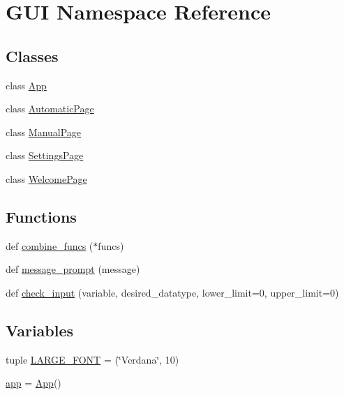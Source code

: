 \hypertarget{namespace_g_u_i}{}\section{G\+UI Namespace Reference}
\label{namespace_g_u_i}
\subsection*{Classes}
\begin{DoxyCompactItemize}
\item 
class \mbox{\hyperlink{class_g_u_i_1_1_app}{App}}
\item 
class \mbox{\hyperlink{class_g_u_i_1_1_automatic_page}{Automatic\+Page}}
\item 
class \mbox{\hyperlink{class_g_u_i_1_1_manual_page}{Manual\+Page}}
\item 
class \mbox{\hyperlink{class_g_u_i_1_1_settings_page}{Settings\+Page}}
\item 
class \mbox{\hyperlink{class_g_u_i_1_1_welcome_page}{Welcome\+Page}}
\end{DoxyCompactItemize}
\subsection*{Functions}
\begin{DoxyCompactItemize}
\item 
def \mbox{\hyperlink{namespace_g_u_i_a4906784b90d5a5544ca9023bee63983e}{combine\+\_\+funcs}} ($\ast$funcs)
\item 
def \mbox{\hyperlink{namespace_g_u_i_aae078fdef2bd79cc7c7c1f2a917c18b1}{message\+\_\+prompt}} (message)
\item 
def \mbox{\hyperlink{namespace_g_u_i_ab5eebe1279ba51c95948fa550f2bc96c}{check\+\_\+input}} (variable, desired\+\_\+datatype, lower\+\_\+limit=0, upper\+\_\+limit=0)
\end{DoxyCompactItemize}
\subsection*{Variables}
\begin{DoxyCompactItemize}
\item 
tuple \mbox{\hyperlink{namespace_g_u_i_a0a43ec6a3ff3feb9855ba08afbe1cff4}{L\+A\+R\+G\+E\+\_\+\+F\+O\+NT}} = (\char`\"{}Verdana\char`\"{}, 10)
\item 
\mbox{\hyperlink{namespace_g_u_i_aa8865a45ffd83d7c6062a02c169bc287}{app}} = \mbox{\hyperlink{class_g_u_i_1_1_app}{App}}()
\end{DoxyCompactItemize}



